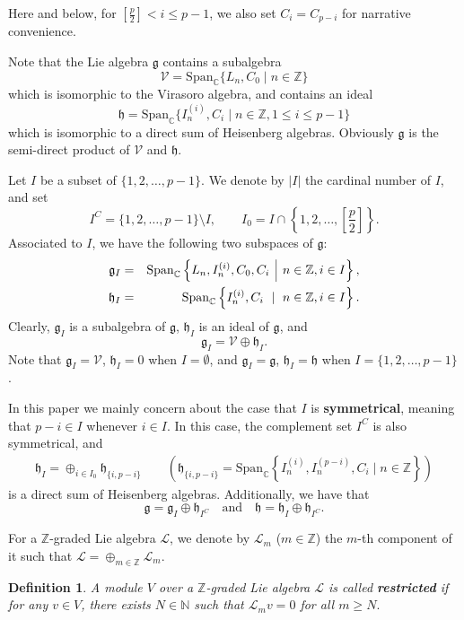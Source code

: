 \documentclass[12pt, reqno]{amsart}
\numberwithin{equation}{section}
\newtheorem{definition}[theorem]{Definition}
\numberwithin{equation}{section}
\def\h{\mathfrak{h}}
\def\g{\mathfrak{g}}
\def\V{\mathcal{V}}
\newcommand{\C}{\mathbb C}
\newcommand{\N}{\mathbb{N}}
\newcommand{\Z}{\mathbb{Z}}
\newcommand{\spanc}[1]{\mathrm{Span}_{\C}\left\{#1\right\}}
\newcommand{\elei}[2]{I_{#1}^{(#2)}}
\begin{document}
Here and below, for $[\frac p2]<i\leq p-1$, we also set $C_i=C_{p-i}$ for narrative convenience.


Note that the Lie algebra $\g$ contains a subalgebra
\[
\V=\mathrm{Span}_\C\{L_n,C_0 \mid n\in\Z\}
\]
 which is isomorphic to the Virasoro algebra, and contains an ideal
\[
\h=\mathrm{Span}_\C\{\elei ni,C_i \mid  n\in\Z, 1\leq i\leq p-1\}
\]
which is isomorphic to a direct sum of Heisenberg algebras.
Obviously $\g$ is the semi-direct product of $\V$ and $\h$.





Let $I$ be a subset  of $\{1,2,\dots,p-1\}$.
We denote by $|I|$ the cardinal number of $I$, and set
\[I^C=\{1,2,\dots,p-1\}\setminus I,\qquad
I_0=I\cap \left\{1,2,\dots,[\frac{p}{2}]\right\}.
\]
Associated to $I$, we have the following two subspaces of $\g$:
\begin{eqnarray}
 \g_I&=&\spanc{L_n,\elei ni, C_0, C_i\ \, \vline\ \, n\in\Z,  i\in I}, \label{defg_I}\\
 \h_I&=&\spanc{\elei ni, C_i\ \mid\  n\in\Z,  i\in I}.\label{defh_I}
\end{eqnarray}
Clearly, $\g_I$ is a subalgebra of $\g$, $\h_I$ is an ideal of $\g$, and
\[
\g_I=\V\oplus \h_I.
\]
Note that $\g_I=\V$, $\h_I=0$ when $I=\emptyset$, and $\g_I=\g$, $\h_I=\h$ when $I=\{1,2,\dots,p-1\}$.

In this paper we mainly concern about the case that $I$ is {\bf symmetrical}, meaning that $p-i\in I$ whenever $i\in I$.
In this case, the complement set $I^C$ is also symmetrical, and
\begin{eqnarray}\label{eq:dechI}
 \h_I=\oplus_{i\in I_0}\h_{\{i,p-i\}}\qquad \left(\h_{\{i,p-i\}}
 =\spanc{I_n^{(i)},I_n^{(p-i)},C_i\mid n\in \Z}\right)
\end{eqnarray}
is a direct sum of Heisenberg algebras.
Additionally, we have that
\[
\g=\g_I\oplus \h_{I^C}\quad\text{and}\quad
\h=\h_I\oplus \h_{I^C}.
\]

For a $\Z$-graded Lie algebra $\mathcal{L}$, we denote by $\mathcal{L}_m$ ($m\in \Z$) the $m$-th component of it such that
$\mathcal{L}=\oplus_{m\in \Z}\mathcal{L}_m$.



\begin{definition}\label{Restricted}
A module $V$ over a $\Z$-graded Lie algebra $\mathcal L$ is called \textbf{restricted}
if for any $v\in V$, there exists $N\in\N$ such that $\mathcal{L}_m v=0$ for all $m\geq N.$
\end{definition}
\end{document}

